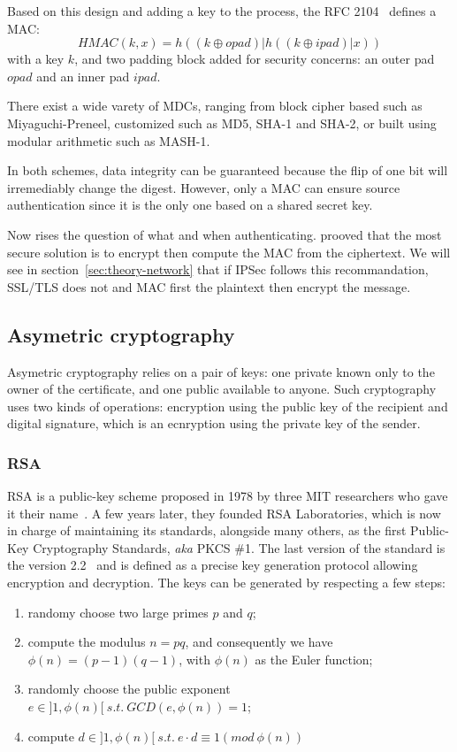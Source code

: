 Based on this design and adding a key to the process, the RFC 2104~\cite{rfc2104} defines a MAC:
\[
	HMAC(k, x) = h((k\oplus opad)|h((k\oplus ipad)|x))
\]
with a key $k$, and two padding block added for security concerns: an outer pad $opad$ and an inner pad $ipad$.

\noindent There exist a wide varety of MDCs, ranging from block cipher based such as Miyaguchi-Preneel, customized such as MD5, SHA-1 and SHA-2, or built using modular arithmetic such as MASH-1.

In both schemes, data integrity can be guaranteed because the flip of one bit will irremediably change the digest.
However, only a MAC can ensure source authentication since it is the only one based on a shared secret key.

Now rises the question of what and when authenticating.
\citet{Bellare2000} prooved that the most secure solution is to encrypt then compute the MAC from the ciphertext.
We will see in section~\ref{sec:theory-network} that if IPSec follows this recommandation, SSL/TLS does not and MAC first the plaintext then encrypt the message.




\subsection{Asymetric cryptography}
Asymetric cryptography relies on a pair of keys: one private known only to the owner of the certificate, and one public available to anyone.
Such cryptography uses two kinds of operations: encryption using the public key of the recipient and digital signature, which is an ecnryption using the private key of the sender.

\subsubsection{RSA}
RSA is a public-key scheme proposed in 1978 by three MIT researchers who gave it their name~\cite{Rivest:1978:MOD:359340.359342}.
A few years later, they founded RSA Laboratories, which is now in charge of maintaining its standards, alongside many others, as the first Public-Key Cryptography Standards, \textit{aka} PKCS \#1.
The last version of the standard is the version 2.2~\cite{pkcs1} and is defined as a precise key generation protocol allowing encryption and decryption.
The keys can be generated by respecting a few steps:
\begin{enumerate}
	\item randomy choose two large primes $p$ and $q$;
	\item compute the modulus $n = p q$, and consequently we have $\phi(n) = (p-1)(q-1)$, with $\phi(n)$ as the Euler function;
	\item randomly choose the public exponent $e \in ]1,\phi(n)[\ s.t.\ GCD(e,\phi(n)) = 1$;
	\item compute $d \in ]1,\phi(n)[\ s.t.\ e \cdot d \equiv 1 (mod\ \phi(n))$
\end{enumerate}

